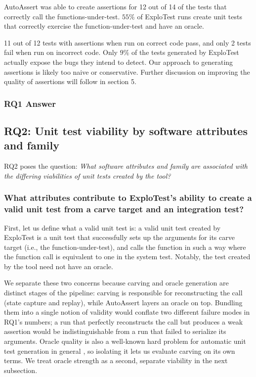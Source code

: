 AutoAssert was able to create assertions for 12 out of 14 of the tests that correctly call the functions-under-test.
$55\%$ of ExploTest runs create unit tests that correctly exercise the function-under-test and have an oracle.

11 out of 12 tests with assertions when run on correct code pass, and only 2 tests fail when run on incorrect code.
Only $9\%$ of the tests generated by ExploTest actually expose the bugs they intend to detect. Our approach
to generating assertions is likely too naive or conservative. Further discussion on improving the quality of
assertions will follow in section 5.

\subsubsection{RQ1 Answer}

\noindent{}


\subsection{RQ2: Unit test viability by software attributes and family}

RQ2 poses the question: \textit{What software attributes and family are associated with the differing viabilities
    of unit tests created by the tool?}

\subsubsection{What attributes contribute to ExploTest's ability to create a valid unit test from a carve target and an integration test?}

First, let us define what a valid unit test is: a valid unit test created by ExploTest is a unit test that successfully sets up the
arguments for its carve target (i.e., the function-under-test), and calls the function in such a way where the function call
is equivalent to one in the system test. Notably, the test created by the tool need not have an oracle.

We separate these two concerns because carving and oracle generation are distinct stages of the pipeline: carving is responsible
for reconstructing the call (state capture and replay), while AutoAssert layers an oracle on top. Bundling them into a single
notion of validity would conflate two different failure modes in RQ1's numbers; a run that perfectly reconstructs the call but
produces a weak assertion would be indistinguishable from a run that failed to serialize its arguments. Oracle quality is
also a well-known hard problem for automatic unit test generation in general \cite{fraser2015does}, so isolating it lets us
evaluate carving on its own terms. We treat oracle strength as a second, separate viability in the next subsection.

